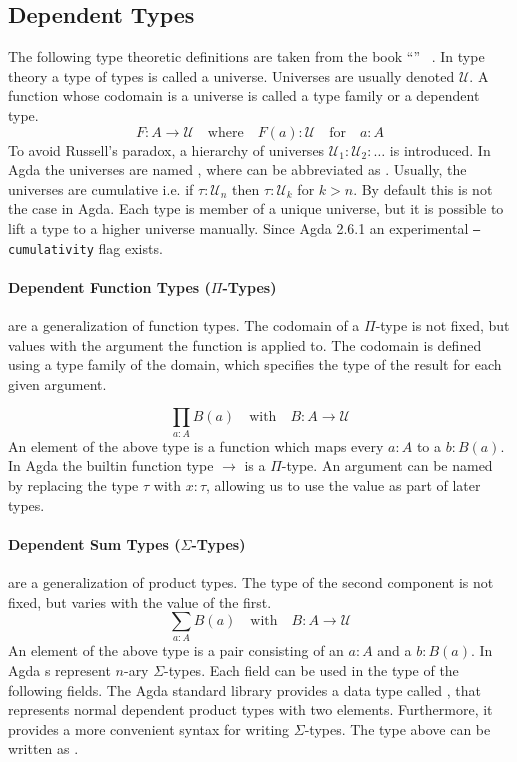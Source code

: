 \subsection{Dependent Types}
\label{preliminaries:dependent-types}
The following type theoretic definitions are taken from the
book ``'' ~\cite{hottbook}.
In type theory a type of types is called a universe.
Universes are usually denoted $\mathcal{U}$.
A function whose codomain is a universe is called a type family or a dependent
type.
$$
F : A \rightarrow \mathcal{U} \quad\text{where}\quad F(a) : \mathcal{U}
\quad\text{for}\quad a : A
$$
To avoid Russell's paradox, a hierarchy of universes $\mathcal{U}_1 :
\mathcal{U}_2 : \dots$ is introduced.
In Agda the universes are named , where 
can be abbreviated as .
Usually, the universes are cumulative i.e. if $\tau : \mathcal{U}_n$ then
$\tau : \mathcal{U}_k$ for $k>n$.
By default this is not the case in Agda.
Each type is member of a unique universe, but it is possible to lift a type to a
higher universe manually.
Since Agda 2.6.1 an experimental \texttt{--cumulativity} flag exists.

\paragraph{Dependent Function Types ($\Pi$-Types)} are a generalization of
function types.
The codomain of a $\Pi$-type is not fixed, but values with the argument the
function is applied to.
The codomain is defined using a type family of the domain, which specifies the
type of the result for each given argument.

$$
\prod_{a : A} B(a) \quad \text{with}\quad B : A \rightarrow\mathcal{U}
$$
An element of the above type is a function which maps every $a : A$ to a $b :
B(a)$.
In Agda the builtin function type $\rightarrow$ is a $\Pi$-type.
An argument can be named by replacing the type $\tau$ with $x : \tau$, allowing
us to use the value as part of later types.

\paragraph{Dependent Sum Types ($\Sigma$-Types)} are a generalization of product
types.
The type of the second component is not fixed, but varies with the value of the
first.
$$
\sum_{a : A} B(a) \quad \text{with}\quad B : A \rightarrow\mathcal{U}
$$
An element of the above type is a pair consisting of an $a : A$ and a $b : B(a)$.
In Agda s represent $n$-ary $\Sigma$-types.
Each field can be used in the type of the following fields.
The Agda standard library provides a data type called , that
represents normal dependent product types with two elements.
Furthermore, it provides a more convenient syntax for writing $\Sigma$-types.
The type above can be written as .

